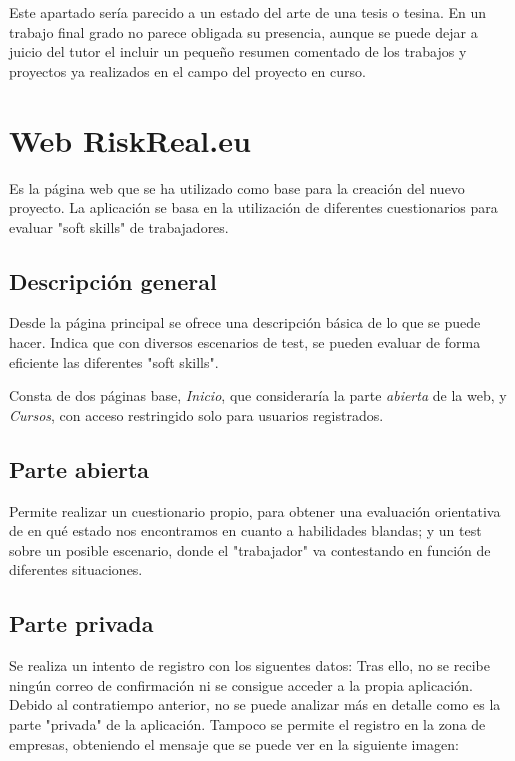 
Este apartado sería parecido a un estado del arte de una tesis o tesina. En un trabajo final grado no parece obligada su presencia, aunque se puede dejar a juicio del tutor el incluir un pequeño resumen comentado de los trabajos y proyectos ya realizados en el campo del proyecto en curso. 

\section{Web RiskReal.eu}
Es la página web \cite{web:riskreal} que se ha utilizado como base para la creación del nuevo proyecto.
La aplicación se basa en la utilización de diferentes cuestionarios para evaluar "soft skills" de trabajadores.

\subsection{Descripción general}
Desde la página principal se ofrece una descripción básica de lo que se puede hacer.
Indica que con diversos escenarios de test, se pueden evaluar de forma eficiente las diferentes "soft skills".

Consta de dos páginas base, \textit{Inicio}, que consideraría la parte \textit{abierta} de la web, y \textit{Cursos}, con acceso restringido solo para usuarios registrados.

\subsection{Parte abierta}
Permite realizar un cuestionario propio, para obtener una evaluación orientativa de en qué estado nos encontramos en cuanto a habilidades blandas; y un test sobre un posible escenario, donde el "trabajador" va contestando en función de diferentes situaciones.

\subsection{Parte privada}
Se realiza un intento de registro con los siguentes datos:
Tras ello, no se recibe ningún correo de confirmación ni se consigue acceder a la propia aplicación.
Debido al contratiempo anterior, no se puede analizar más en detalle como es la parte "privada" de la aplicación.
Tampoco se permite el registro en la zona de empresas, obteniendo el mensaje que se puede ver en la siguiente imagen:





